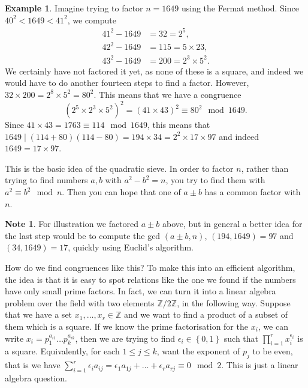 \documentclass{article}
\newcommand{\Z}{\mathbb{Z}}
\newcommand{\rb}[1]{\left( #1 \right)}
\newcommand{\cb}[1]{\left\{ #1 \right\}}
\theoremstyle{definition}\newtheorem{definition}{Definition}
\theoremstyle{definition}\newtheorem*{remark}{Remark}
\theoremstyle{definition}\newtheorem*{example}{Example}
\theoremstyle{definition}\newtheorem*{note}{Note}
\begin{document}
\begin{example}
Imagine trying to factor $ n = 1649 $ using the Fermat method. Since $ 40^2 < 1649 < 41^2 $, we compute
\begin{align*}
41^2 - 1649 & = 32 = 2^5, \\
42^2 - 1649 & = 115 = 5 \times 23, \\
43^2 - 1649 & = 200 = 2^3 \times 5^2.
\end{align*}
We certainly have not factored it yet, as none of these is a square, and indeed we would have to do another fourteen steps to find a factor. However, $ 32 \times 200 = 2^8 \times 5^2 = 80^2 $. This means that we have a congruence
$$ \rb{2^5 \times 2^3 \times 5^2}^2 = \rb{41 \times 43}^2 \equiv 80^2 \mod 1649. $$
Since $ 41 \times 43 = 1763 \equiv 114 \mod 1649 $, this means that $ 1649 \mid \rb{114 + 80}\rb{114 - 80} = 194 \times 34 = 2^2 \times 17 \times 97 $ and indeed $ 1649 = 17 \times 97 $.
\end{example}

This is the basic idea of the quadratic sieve. In order to factor $ n $, rather than trying to find numbers $ a, b $ with $ a^2 - b^2 = n $, you try to find them with $ a^2 \equiv b^2 \mod n $. Then you can hope that one of $ a \pm b $ has a common factor with $ n $.

\begin{note}
For illustration we factored $ a \pm b $ above, but in general a better idea for the last step would be to compute the gcd $ \rb{a \pm b, n} $, $ \rb{194, 1649} = 97 $ and $ \rb{34, 1649} = 17 $, quickly using Euclid's algorithm.
\end{note}

How do we find congruences like this? To make this into an efficient algorithm, the idea is that it is easy to spot relations like the one we found if the numbers have only small prime factors. In fact, we can turn it into a linear algebra problem over the field with two elements $ \Z / 2\Z $, in the following way. Suppose that we have a set $ x_1, \dots, x_r \in \Z $ and we want to find a product of a subset of them which is a square. If we know the prime factorisation for the $ x_i $, we can write $ x_i = p_1^{a_{i1}} \dots p_k^{a_{ik}} $, then we are trying to find $ \epsilon_i \in \cb{0, 1} $ such that $ \prod_{i = 1}^r x_i^{\epsilon_i} $ is a square. Equivalently, for each $ 1 \le j \le k $, want the exponent of $ p_j $ to be even, that is we have $ \sum_{i = 1}^r \epsilon_ia_{ij} = \epsilon_1a_{1j} + \dots + \epsilon_ra_{rj} \equiv 0 \mod 2 $. This is just a linear algebra question.
\end{document}
